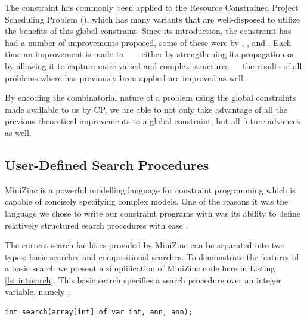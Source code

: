 The \cumu constraint has commonly been applied to the Resource Constrained
Project Scheduling Problem (\RCPSP), which has many variants that 
are well-disposed to utilize the benefits of this global constraint.
Since its introduction, the \cumu constraint has had a number of improvements
proposed, some of these were by , ,
 and . Each time an improvement
is made to \cumu~--- either by strengthening its propagation or by allowing it
to capture more varied and complex structures --- the results of all
problems where \cumu has previously been applied are improved as well.


By encoding the combinatorial nature of a problem using the global
constraints made available to us by CP, we are able to not
only take advantage of all the previous theoretical improvements to a global
constraint, but all future advances as well.

\subsection{User-Defined Search Procedures}
\label{sec:lit:cpSearch}
MiniZinc is a powerful modelling language for constraint programming
which is capable of concisely specifying complex models.
One of the reasons it was the language we chose to write
our constraint programs with was its ability to define relatively
structured search procedures with ease \cite{Schrijvers2013a,Schrijvers2013b,VanHentenryck2000}.

The current search facilities provided by MiniZinc can be 
separated into two types: basic searches and compositional searches.
To demonstrate the features of a basic search we present
a simplification of MiniZinc code here in 
Listing \ref{lst:intsearch}. This basic search specifies a
search procedure over an integer variable, namely \intser,
\begin{lstlisting}[caption={Basic integer search procedure},label={lst:intsearch},language=minizinc]
int_search(array[int] of var int, ann, ann);
\end{lstlisting}\vspace{5mm}

